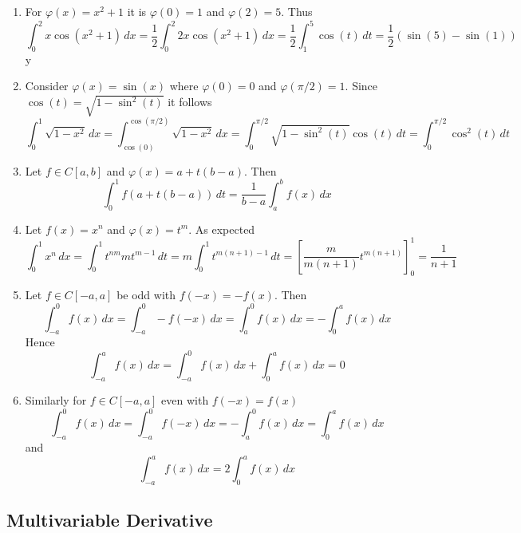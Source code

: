 \begin{examples}\hfill
    \begin{enumerate}
        \item For \( \varphi(x) = x^2 + 1 \) it is \( \varphi(0) = 1 \) and \( \varphi(2) = 5 \). Thus
              \[
                  \int_0^2 x\cos(x^2 + 1)\,dx
                  = \frac{1}{2} \int_0^2 2x\cos(x^2 + 1)\,dx
                  = \frac{1}{2} \int_1^5 \cos(t)\,dt
                  = \frac{1}{2} (\sin(5) - \sin(1))
              \]y
        \item Consider \( \varphi(x) = \sin(x) \) where \( \varphi(0) = 0 \) and \( \varphi(\pi / 2) = 1 \).
              Since \( \cos(t) = \sqrt{1 - \sin^2(t)} \) it follows
              \[
                  \int_0^1 \sqrt{1 - x^2}\,dx
                  = \int_{\cos(0)}^{\cos(\pi/2)} \sqrt{1 - x^2}\,dx
                  = \int_0^{\pi/2} \sqrt{1 - \sin^2(t)}\cos(t)\,dt
                  = \int_0^{\pi/2} \cos^2(t)\,dt
              \]
        \item Let \(f \in C[a,b] \) and \( \varphi(x) = a + t(b - a) \). Then
              \[
                  \int_0^1 f(a + t(b - a))\,dt = \frac{1}{b - a} \int_a^b f(x)\,dx
              \]
        \item Let \(f(x) = x^n \) and \( \varphi(x) = t^m \). As expected
              \[
                  \int_0^1 x^n\,dx
                  = \int_0^1 t^{nm} m t^{m - 1}\,dt
                  = m\int_0^1 t^{m(n + 1) - 1}\,dt
                      = {\left[\frac{m}{m(n + 1)} t^{m(n + 1)}\right]}_0^1
                  = \frac{1}{n + 1}
              \]
        \item Let \( f \in C[-a,a] \) be odd with \( f(-x) = -f(x) \). Then
              \[
                  \int_{-a}^0 f(x)\,dx = \int_{-a}^0 -f(-x)\,dx = \int_a^0 f(x)\,dx = - \int_0^a f(x)\,dx
              \]
              Hence
              \[
                  \int_{-a}^a f(x)\,dx = \int_{-a}^0 f(x)\,dx + \int_0^a f(x)\,dx = 0
              \]
        \item Similarly for \( f \in C[-a,a] \) even with \( f(-x) = f(x) \)
              \[
                  \int_{-a}^0 f(x)\,dx = \int_{-a}^0 f(-x)\,dx = - \int_a^0 f(x)\,dx = \int_0^a f(x)\,dx
              \]
              and
              \[
                  \int_{-a}^a f(x)\,dx = 2 \int_0^a f(x)\,dx
              \]
    \end{enumerate}
\end{examples}
\bigskip


\subsection{Multivariable Derivative}
\bigskip

